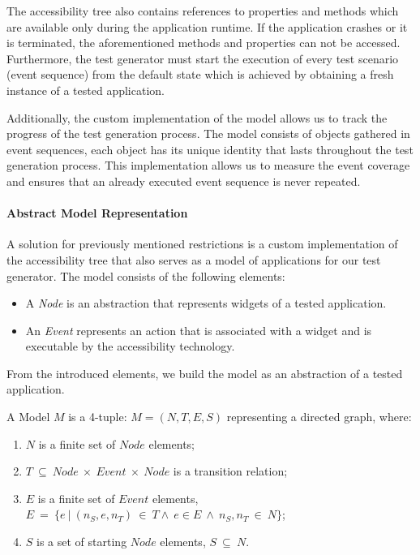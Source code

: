 The accessibility tree also contains references to properties and methods which are available only during the application runtime. If the application crashes or it is terminated, the aforementioned methods and properties can not be accessed. Furthermore, the test generator must start the execution of every test scenario (event sequence) from the default state which is achieved by obtaining a fresh instance of a tested application.

Additionally, the custom implementation of the model allows us to track the progress of the test generation process. The model consists of objects gathered in event sequences, each object has its unique identity that lasts throughout the test generation process. This implementation allows us to measure the event coverage and ensures that an already executed event sequence is never repeated.

\paragraph{Abstract Model Representation} A solution for previously mentioned restrictions is a custom implementation of the accessibility tree that also serves as a model of applications for our test generator. The model consists of the following elements:

\begin{itemize}
\item A \textit{Node} is an abstraction that represents widgets of a tested application.
\item An \textit{Event} represents an action that is associated with a widget and is executable by the accessibility technology.
\end{itemize}

From the introduced elements, we build the model as an abstraction of a tested application. 

\theoremstyle{definition}
\begin{definition}
A Model $M$ is a 4-tuple: $M = (N, T, E, S)$ representing a directed graph, where:
\begin{enumerate}
\item $N$ is a finite set of $Node$ elements; 
\item $T\ \subseteq\ Node\ \times \ Event\ \times \ Node$ is a transition relation;
\item $E$ is a finite set of $Event$ elements,  $E\ =\ \{e\ |\ (n_S, e, n_T)\ \in\ T \land \ e \in E \ \land \ n_S,n_T\ \in \ N\}$;
\item $S$ is a set of starting $Node$ elements, $S\ \subseteq\ N$.
\end{enumerate}
\end{definition}

